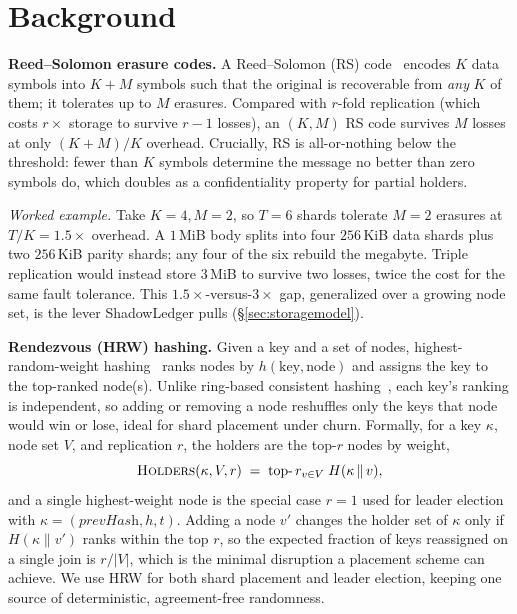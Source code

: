 \section{Background}
\label{sec:bg}
\textbf{Reed--Solomon erasure codes.} A Reed--Solomon (RS) code~\cite{reed1960polynomial}
encodes $K$ data symbols into $K{+}M$ symbols such that the original is recoverable from
\emph{any} $K$ of them; it tolerates up to $M$ erasures. Compared with $r$-fold replication
(which costs $r\times$ storage to survive $r{-}1$ losses), an $(K,M)$ RS code survives $M$
losses at only $(K{+}M)/K$ overhead. Crucially, RS is all-or-nothing below the threshold:
fewer than $K$ symbols determine the message no better than zero symbols do, which doubles as
a confidentiality property for partial holders.

\emph{Worked example.} Take $K{=}4,M{=}2$, so $T{=}6$ shards tolerate $M{=}2$ erasures at
$T/K=1.5\times$ overhead. A $1$\,MiB body splits into four $256$\,KiB data shards plus two
$256$\,KiB parity shards; any four of the six rebuild the megabyte. Triple replication would
instead store $3$\,MiB to survive two losses, twice the cost for the same fault tolerance.
This $1.5\times$-versus-$3\times$ gap, generalized over a growing node set, is the lever
ShadowLedger pulls (\S\ref{sec:storagemodel}).

\textbf{Rendezvous (HRW) hashing.} Given a key and a set of nodes, highest-random-weight
hashing~\cite{thaler1998rendezvous} ranks nodes by $h(\text{key},\text{node})$ and assigns the
key to the top-ranked node(s). Unlike ring-based consistent hashing~\cite{karger1997consistent},
each key's ranking is independent, so adding or removing a node reshuffles only the keys that
node would win or lose, ideal for shard placement under churn. Formally, for a key $\kappa$, node
set $V$, and replication $r$, the holders are the top-$r$ nodes by weight,
\[
\textsc{Holders}(\kappa,V,r) \;=\; \operatorname*{top\text{-}}r_{v\in V}\; H(\kappa \,\|\, v),
\]
and a single highest-weight node is the special case $r{=}1$ used for leader election with
$\kappa=(\textit{prevHash},h,t)$. Adding a node $v'$ changes the holder set of $\kappa$ only if
$H(\kappa\|v')$ ranks within the top $r$, so the expected fraction of keys reassigned on a single
join is $r/|V|$, which is the minimal disruption a placement scheme can achieve. We use HRW for
both shard placement and leader election, keeping one source of deterministic, agreement-free
randomness.

